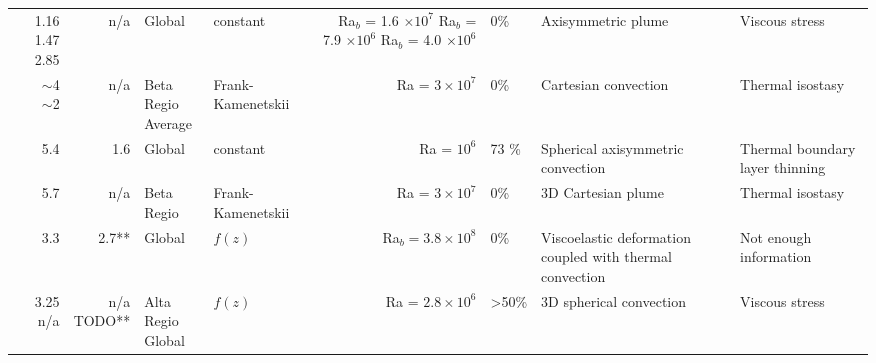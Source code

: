 \begin{landscape}
\begin{longtable}{ @{} p{4cm} r r p{2cm} p{2cm} r p{1.5cm} p{3.2cm} p{3.1cm} @{} }
\citet{Nimmo1996} &  \makecell[tr]{1.16 \\ 1.47 \\ 2.85}  &  n/a  & Global & constant & \makecell[tr]{Ra$_b$ = 1.6 $\times 10^7$ \\  Ra$_b$ = 7.9 $\times 10^6$\\ Ra$_b$ = 4.0 $\times 10^6$ } & 0\% & Axisymmetric plume & Viscous stress \\



\citet{Solomatov1996a} & \makecell[tl]{$\sim$4 \\ $\sim$2} & n/a  & \makecell[cl]{Beta Regio \\ Average} & Frank-Kamenetskii  & Ra = $3 \times 10^7$  & 0\% & Cartesian convection & Thermal isostasy  \\



\citet{Kiefer1998} &  5.4\textendash 10.9 & 1.6\textendash 2.7  & Global & constant & Ra = $10^6$ & 73 \% & Spherical axisymmetric convection & Thermal boundary layer thinning \\



\citet{Vezolainen2004} & 5.7 & n/a & Beta Regio & Frank-Kamenetskii  & Ra = $3 \times 10^7$ & 0\% & 3D Cartesian plume & Thermal isostasy  \\






\citet{Golle2012} & 3.3 & 2.7**  & Global & $f(z)$ & Ra$_b = 3.8\times 10^8$ & 0\% & Viscoelastic deformation coupled with thermal convection &  Not enough information \\



\citet{Benesova2012} &  \makecell[tr]{3.25 \\ n/a} & \makecell[tr]{n/a \\ TODO**}  & \makecell[tl]{Alta Regio \\ Global} & $f(z)$ & Ra = $2.8 \times 10^6$ & \textgreater 50\% & 3D spherical convection & Viscous stress \\




\end{longtable}
\end{landscape}
